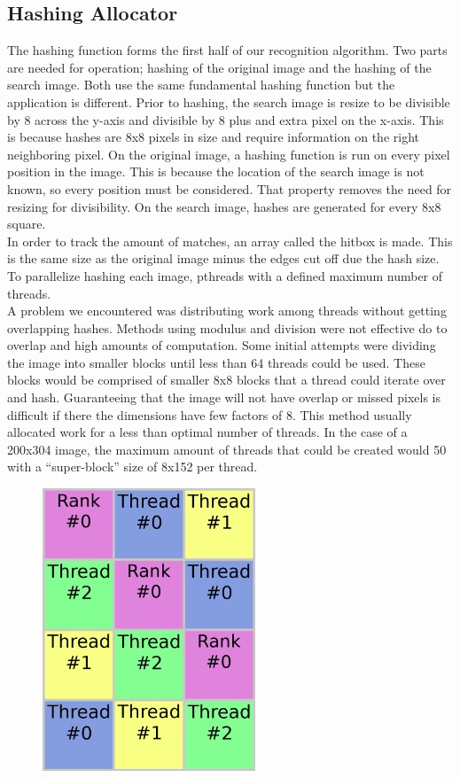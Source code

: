 \documentclass[10pt, journal]{vgtc}                %
\begin{document}
\subsection{Hashing Allocator}
\begin{flushleft}
The hashing function forms the first half of our recognition algorithm. Two parts are needed for operation; hashing of the original image and the hashing of the search image. Both use the same fundamental hashing function but the application is different. Prior to hashing, the search image is resize to be divisible by 8 across the y-axis and divisible by 8 plus and extra pixel on the x-axis. This is because hashes are 8x8 pixels in size and require information on the right neighboring pixel. On the original image, a hashing function is run on every pixel position in the image. This is because the location of the search image is not known, so every position must be considered. That property removes the need for resizing for divisibility. On the search image, hashes are generated for every 8x8 square.\\
In order to track the amount of matches, an array called the hitbox is made. This is the same size as the original image minus the edges cut off due the hash size. To parallelize hashing each image, pthreads with a defined maximum number of threads.\\
A problem we encountered was distributing work among threads without getting overlapping hashes. Methods using modulus and division were not effective do to overlap and high amounts of computation. Some initial attempts were dividing the image into smaller blocks until less than 64 threads could be used. These blocks would be comprised of smaller 8x8 blocks that a thread could iterate over and hash. Guaranteeing that the image will not have overlap or missed pixels is difficult if there the dimensions have few factors of 8. This method usually allocated work for a less than optimal number of threads. In the case of a 200x304 image, the maximum amount of threads that could be created would 50 with a “super-block” size of 8x152 per thread.\\
\begin{figure}[h!]
	\centering
	\includegraphics[width=2.5in]{thread_visualization.png}

\end{figure}
\end{flushleft}
\end{document}
